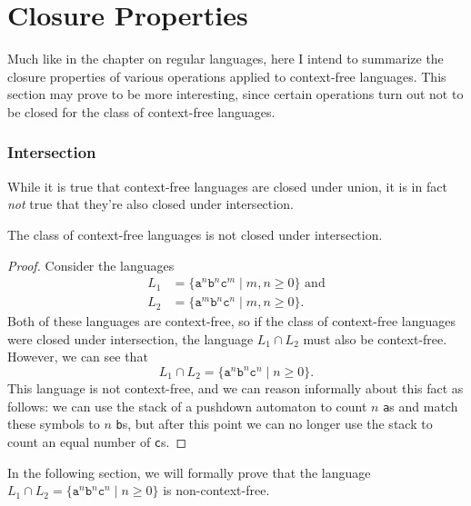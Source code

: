 \section{Closure Properties}\label{sec:closurepropertiescontextfree}

\begin{construction}
Much like in the chapter on regular languages, here I intend to summarize the closure properties of various operations applied to context-free languages. This section may prove to be more interesting, since certain operations turn out not to be closed for the class of context-free languages.
\end{construction}

\subsubsection*{Intersection}

While it is true that context-free languages are closed under union, it is in fact \emph{not} true that they're also closed under intersection.

\begin{theorem}\label{thm:CFLnonclosureintersection}
The class of context-free languages is not closed under intersection.

\begin{proof}
Consider the languages
\begin{align*}
L_{1}	&= \{\texttt{a}^{n}\texttt{b}^{n}\texttt{c}^{m} \mid m, n \geq 0\} \text{ and} \\
L_{2}	&= \{\texttt{a}^{m}\texttt{b}^{n}\texttt{c}^{n} \mid m, n \geq 0\}.
\end{align*}
Both of these languages are context-free, so if the class of context-free languages were closed under intersection, the language $L_{1} \cap L_{2}$ must also be context-free. However, we can see that
\begin{equation*}
L_{1} \cap L_{2} = \{\texttt{a}^{n}\texttt{b}^{n}\texttt{c}^{n} \mid n \geq 0\}.
\end{equation*}
This language is not context-free, and we can reason informally about this fact as follows: we can use the stack of a pushdown automaton to count $n$ \texttt{a}s and match these symbols to $n$ \texttt{b}s, but after this point we can no longer use the stack to count an equal number of \texttt{c}s.
\end{proof}
\end{theorem}

\begin{remark}
In the following section, we will formally prove that the language $L_{1} \cap L_{2} = \{\texttt{a}^{n}\texttt{b}^{n}\texttt{c}^{n} \mid n \geq 0\}$ is non-context-free.
\end{remark}

